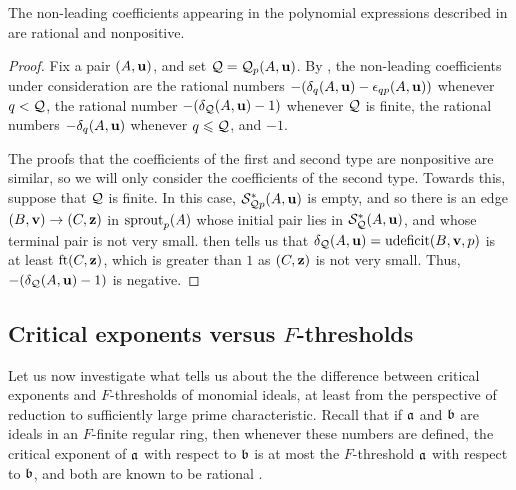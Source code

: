 \documentclass{amsart}
\begin{document}
\begin{proposition}
\label{non-leading coefficients: P}
The non-leading coefficients appearing in the polynomial expressions described in  are rational and nonpositive.
\end{proposition}

\begin{proof}
   Fix a pair $(A,\mathbf{u})$, and set $\mathcal{Q}=\mathcal{Q}_p(A,\mathbf{u})$.
   By , the non-leading coefficients under consideration are the rational numbers $-(\delta_{q}(A,\mathbf{u})-\epsilon_{qp}(A,\mathbf{u}))$ whenever $q < \mathcal{Q}$, the rational number $-(\delta_{\mathcal{Q}}(A,\mathbf{u}) - 1)$ whenever $\mathcal{Q}$ is finite, the rational numbers $-\delta_q(A,\mathbf{u})$ whenever $q\leqslant \mathcal{Q}$, and $-1$.

   The proofs that the coefficients of the first and second type are nonpositive are similar, so we will only consider the coefficients of the second type.
   Towards this, suppose that $\mathcal{Q}$ is finite.
   In this case, $\mathcal{S}^{\ast}_{\mathcal{Q} p}(A,\mathbf{u})$ is empty, and so there is an edge $(B,\mathbf{v}) \to (C,\mathbf{z})$ in $\operatorname{sprout}_p(A)$ whose initial pair lies in $\mathcal{S}^{\ast}_{\mathcal{Q}}(A,\mathbf{u})$, and whose terminal pair is not very small.  then tells us that $\delta_{\mathcal{Q}}(A,\mathbf{u}) = \operatorname{udeficit}(B,\mathbf{v},p)$ is at least $\operatorname{ft}(C, \mathbf{z})$, which is greater than $1$ as $(C,\mathbf{z})$ is not very small.
   Thus, $-(\delta_{\mathcal{Q}}(A,\mathbf{u})-1)$ is negative.
\end{proof}

\subsection{Critical exponents versus $F$-thresholds}
\label{crit versus ft: SS}

Let us now investigate what  tells us about the the difference between critical exponents and $F$-thresholds of monomial ideals, at least from the perspective of reduction to sufficiently large prime characteristic.
Recall that if $\mathfrak{a}$ and $\mathfrak{b}$ are ideals in an $F$-finite regular ring, then whenever these numbers are defined, the critical exponent of $\mathfrak{a}$ with respect to $\mathfrak{b}$ is at most the $F$-threshold $\mathfrak{a}$ with respect to $\mathfrak{b}$, and both are known to be rational \cite[Corollary~5.8]{hernandez+etal.frobenius_powers}.
\end{document}

